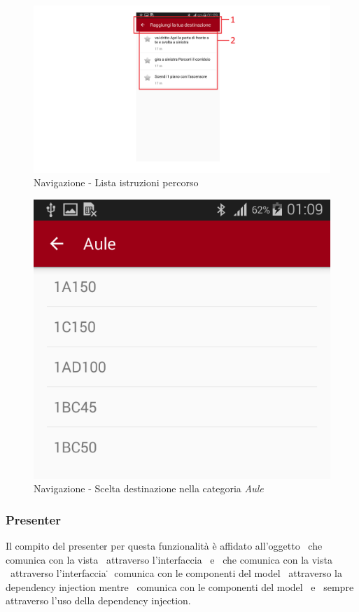 \documentclass[../Funzionalita.tex]{subfiles}
\begin{document}
		\newpage	
		\vfill
			\begin{figure} [h]
				\centering
				\includegraphics[width=\textwidth]{img/Navigazione-NavigationView_}
				\caption{Navigazione - Lista istruzioni percorso}
				\label{fig:Navigazione-NavigationView}
			\end{figure}
			\vfill
			\begin{figure} [h]
				\centering
				\includegraphics[scale=0.3]{img/Navigazione-PoiCategoryView_}
				\caption{Navigazione - Scelta destinazione nella categoria \textit{Aule}}
				\label{fig:Navigazione-PoiCategoryView}
			\end{figure}
		\vfill
		
		
		\newpage
		\subsubsection{Presenter}
			Il compito del presenter per questa funzionalità è affidato all'oggetto \PoiCategoryActivity\ che comunica con la vista \PoiCategoryViewImp\ attraverso l'interfaccia \HomeView\ e \NavigationActivity\ che comunica con la vista \NavigationViewImp\ attraverso l'interfaccia \NavigationView\. \PoiCategoryActivity\ comunica con le componenti del model \InformationManager\ attraverso la dependency injection mentre \NavigationActivity\ comunica con le componenti del model \InformationManager\ e \NavigationManager\ sempre attraverso l'uso della dependency injection.
		
\end{document}
